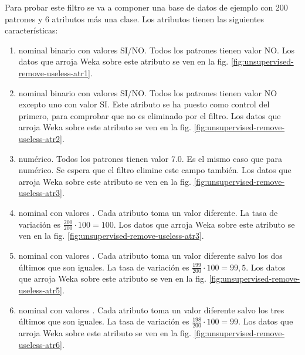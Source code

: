 Para probar este filtro se va a componer una base de datos de ejemplo con 200 patrones y 6 atributos más una clase. Los atributos tienen las siguientes características:
\begin{enumerate}
    \item {} nominal binario con valores SI/NO. Todos los patrones tienen valor NO. Los datos que arroja Weka sobre este atributo se ven en la fig. \ref{fig:unsupervised-remove-useless-atr1}.
    \item {} nominal binario con valores SI/NO. Todos los patrones tienen valor NO excepto uno con valor SI. Este atributo se ha puesto como control del primero, para comprobar que no es eliminado por el filtro. Los datos que arroja Weka sobre este atributo se ven en la fig. \ref{fig:unsupervised-remove-useless-atr2}.    
    \item {} numérico. Todos los patrones tienen valor 7.0. Es el mismo caso que  para numérico. Se espera que el filtro elimine este campo también. Los datos que arroja Weka sobre este atributo se ven en la fig. \ref{fig:unsupervised-remove-useless-atr3}.
    \item {} nominal con valores . Cada atributo toma un valor diferente. La tasa de variación es $\frac{200}{200}\cdot100=100$. Los datos que arroja Weka sobre este atributo se ven en la fig. \ref{fig:unsupervised-remove-useless-atr3}.
    \item {} nominal con valores . Cada atributo toma un valor diferente salvo los dos últimos que son iguales. La tasa de variación es $\frac{199}{200}\cdot100=99,5$. Los datos que arroja Weka sobre este atributo se ven en la fig. \ref{fig:unsupervised-remove-useless-atr5}.
    \item {} nominal con valores . Cada atributo toma un valor diferente salvo los tres últimos que son iguales. La tasa de variación es $\frac{198}{200}\cdot100=99$. Los datos que arroja Weka sobre este atributo se ven en la fig. \ref{fig:unsupervised-remove-useless-atr6}.
\end{enumerate}

